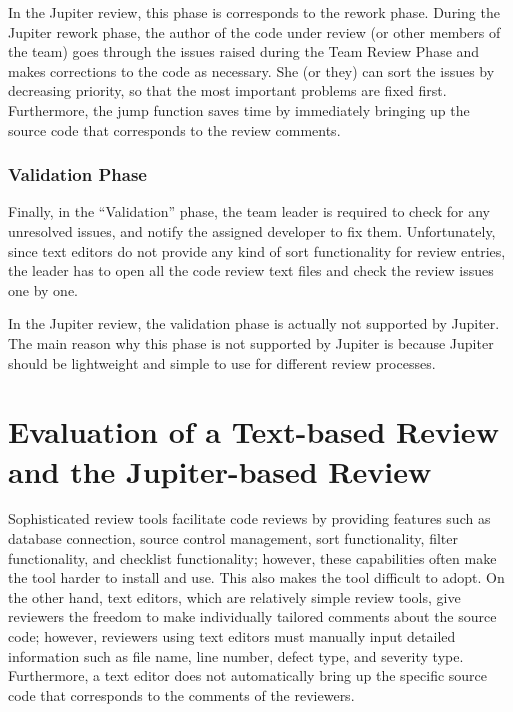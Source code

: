In the Jupiter review, this phase is corresponds to the rework phase. During the Jupiter rework phase, the author of the code under review (or other members of the team) goes through the issues raised during the Team Review Phase and makes corrections to the code as necessary.  She (or they) can sort the issues by decreasing priority, so that the most important problems are fixed first. Furthermore, the jump function saves time by immediately bringing up the source code that corresponds to the review comments.

\subsection{Validation Phase}
\label{subsec:validation-phase}

Finally, in the ``Validation'' phase, the team leader is required to check for any unresolved issues, and notify the assigned developer to fix them. Unfortunately, since text editors do not provide any kind of sort functionality for review entries, the leader has to open all the code review text files and check the review issues one by one.

In the Jupiter review, the validation phase is actually not supported by Jupiter. The main reason why this phase is not supported by Jupiter is because Jupiter should be lightweight and simple to use for different review processes.

\chapter{Evaluation of a Text-based Review and the Jupiter-based Review}
\label{ch:evaluation-of-a-text-based-review-and-the-jupiter-based-review}

Sophisticated review tools facilitate code reviews by providing features such as database connection, source control management, sort functionality, filter functionality, and checklist functionality; however, these capabilities often make the tool harder to install and use. This also makes the tool difficult to adopt. On the other hand, text editors, which are relatively simple review tools, give reviewers the freedom to make individually tailored comments about the source code; however, reviewers using text editors must manually input detailed information such as file name, line number, defect type, and severity type. Furthermore, a text editor does not automatically bring up the specific source code that corresponds to the comments of the reviewers.


